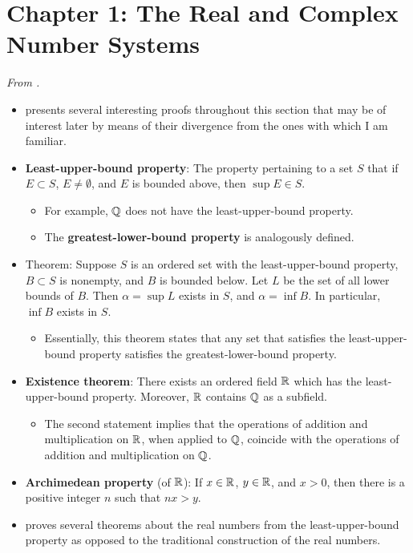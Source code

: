 \documentclass[../../notes.tex]{subfiles}
\begin{document}
\section{Chapter 1: The Real and Complex Number Systems}
\emph{From \textcite{bib:Rudin}.}
\begin{itemize}
    \item {}\textcite{bib:Rudin} presents several interesting proofs throughout this section that may be of interest later by means of their divergence from the ones with which I am familiar.
    \item \textbf{Least-upper-bound property}: The property pertaining to a set $S$ that if $E\subset S$, $E\neq\emptyset$, and $E$ is bounded above, then $\sup E\in S$.
    \begin{itemize}
        \item For example, $\mathbb{Q}$ does not have the least-upper-bound property.
        \item The \textbf{greatest-lower-bound property} is analogously defined.
    \end{itemize}
    \item Theorem: Suppose $S$ is an ordered set with the least-upper-bound property, $B\subset S$ is nonempty, and $B$ is bounded below. Let $L$ be the set of all lower bounds of $B$. Then $\alpha=\sup L$ exists in $S$, and $\alpha=\inf B$. In particular, $\inf B$ exists in $S$.
    \begin{itemize}
        \item Essentially, this theorem states that any set that satisfies the least-upper-bound property satisfies the greatest-lower-bound property.
    \end{itemize}
    \item \textbf{Existence theorem}: There exists an ordered field $\mathbb{R}$ which has the least-upper-bound property. Moreover, $\mathbb{R}$ contains $\mathbb{Q}$ as a subfield.
    \begin{itemize}
        \item The second statement implies that the operations of addition and multiplication on $\mathbb{R}$, when applied to $\mathbb{Q}$, coincide with the operations of addition and multiplication on $\mathbb{Q}$.
    \end{itemize}
    \item \textbf{Archimedean property} (of $\mathbb{R}$): If $x\in\mathbb{R}$, $y\in\mathbb{R}$, and $x>0$, then there is a positive integer $n$ such that $nx>y$.
    \item \textcite{bib:Rudin} proves several theorems about the real numbers from the least-upper-bound property as opposed to the traditional construction of the real numbers.

\end{itemize}
\end{document}
